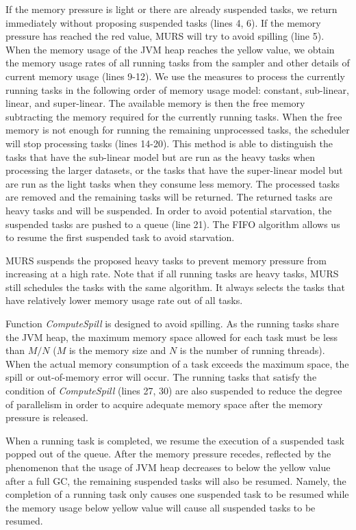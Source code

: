 If the memory pressure is light or there are already suspended tasks, we return immediately without proposing suspended tasks (lines 4, 6). If the memory pressure has reached the red value, MURS will try to avoid spilling (line 5). When the memory usage of the JVM heap reaches the yellow value, we obtain the memory usage rates of all running tasks from the sampler and other details of current memory usage (lines 9-12). We use the measures to process the currently running tasks in the following order of memory usage model: constant, sub-linear, linear, and super-linear. The available memory is then the free memory subtracting the memory required for the currently running tasks. When the free memory is not enough for running the remaining unprocessed tasks, the scheduler will stop processing tasks (lines 14-20). This method is able to distinguish the tasks that have the sub-linear model but are run as the heavy tasks when processing the larger datasets, or the tasks that have the super-linear model but are run as the light tasks when they consume less memory. The processed tasks are removed and the remaining tasks will be returned. The returned tasks are heavy tasks and will be suspended. In order to avoid potential starvation, the suspended tasks are pushed to a queue (line 21). The FIFO algorithm allows us to resume the first suspended task to avoid starvation. 

MURS suspends the proposed heavy tasks to prevent memory pressure from increasing at a high rate. Note that if all running tasks are heavy tasks, MURS still schedules the tasks with the same algorithm. It always selects the tasks that have relatively lower memory usage rate out of all tasks. 

Function \textit{ComputeSpill} is designed to avoid spilling. As the running tasks share the JVM heap, the maximum memory space allowed for each task must be less than $M/N$ ($M$ is the memory size and $N$ is the number of running threads). When the actual memory consumption of a task exceeds the maximum space, the spill or out-of-memory error will occur. The running tasks that satisfy the condition of \textit{ComputeSpill} (lines 27, 30) are also suspended to reduce the degree of parallelism in order to acquire adequate memory space after the memory pressure is released.   

When a running task is completed, we resume the execution of a suspended task popped out of the queue. After the memory pressure recedes, reflected by the phenomenon that the usage of JVM heap decreases to below the yellow value after a full GC, the remaining suspended tasks will also be resumed. Namely, the completion of a running task only causes one suspended task to be resumed while the memory usage below yellow value will cause all suspended tasks to be resumed.

